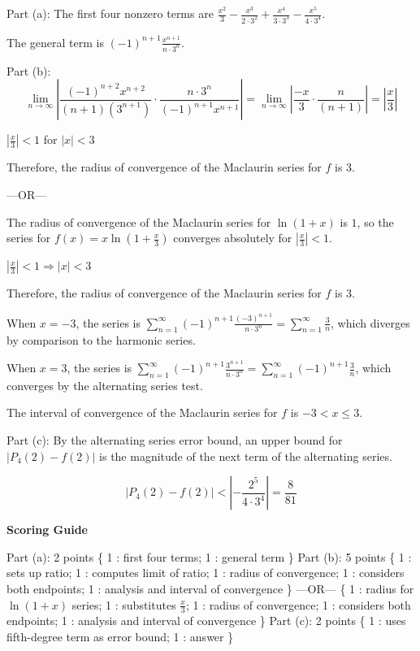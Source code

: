 \documentclass[12pt,addpoints,answers]{exam}
\begin{document}
\begin{questions}
\begin{solution}
Part (a): The first four nonzero terms are $\frac{x^2}{3} - \frac{x^3}{2 \cdot 3^2} + \frac{x^4}{3 \cdot 3^3} - \frac{x^5}{4 \cdot 3^4}$. \par The general term is $(-1)^{n+1} \frac{x^{n+1}}{n \cdot 3^n}$. \par Part (b): $$\lim_{n \to \infty} \left| \frac{(-1)^{n+2} x^{n+2}}{(n+1)(3^{n+1})} \cdot \frac{n \cdot 3^n}{(-1)^{n+1} x^{n+1}} \right| = \lim_{n \to \infty} \left| \frac{-x}{3} \cdot \frac{n}{(n+1)} \right| = \left| \frac{x}{3} \right|$$ \par $\left| \frac{x}{3} \right| < 1$ for $|x| < 3$ \par Therefore, the radius of convergence of the Maclaurin series for $f$ is $3$. \par —OR— \par The radius of convergence of the Maclaurin series for $\ln(1 + x)$ is $1$, so the series for $f(x) = x \ln\left(1 + \frac{x}{3}\right)$ converges absolutely for $\left|\frac{x}{3}\right| < 1$. \par $\left|\frac{x}{3}\right| < 1 \Rightarrow |x| < 3$ \par Therefore, the radius of convergence of the Maclaurin series for $f$ is $3$. \par When $x = -3$, the series is $\sum_{n=1}^{\infty} (-1)^{n+1} \frac{(-3)^{n+1}}{n \cdot 3^n} = \sum_{n=1}^{\infty} \frac{3}{n}$, which diverges by comparison to the harmonic series. \par When $x = 3$, the series is $\sum_{n=1}^{\infty} (-1)^{n+1} \frac{3^{n+1}}{n \cdot 3^n} = \sum_{n=1}^{\infty} (-1)^{n+1} \frac{3}{n}$, which converges by the alternating series test. \par The interval of convergence of the Maclaurin series for $f$ is $-3 < x \le 3$. \par Part (c): By the alternating series error bound, an upper bound for $|P_4(2) - f(2)|$ is the magnitude of the next term of the alternating series. \par $$|P_4(2) - f(2)| < \left| -\frac{2^5}{4 \cdot 3^4} \right| = \frac{8}{81}$$
\par\medskip
\textbf{Scoring Guide}\par
Part (a): 2 points \{ 1 : first four terms; 1 : general term \} Part (b): 5 points \{ 1 : sets up ratio; 1 : computes limit of ratio; 1 : radius of convergence; 1 : considers both endpoints; 1 : analysis and interval of convergence \} —OR— \{ 1 : radius for $\ln(1 + x)$ series; 1 : substitutes $\frac{x}{3}$; 1 : radius of convergence; 1 : considers both endpoints; 1 : analysis and interval of convergence \} Part (c): 2 points \{ 1 : uses fifth-degree term as error bound; 1 : answer \}
\end{solution}
\end{questions}
\end{document}
